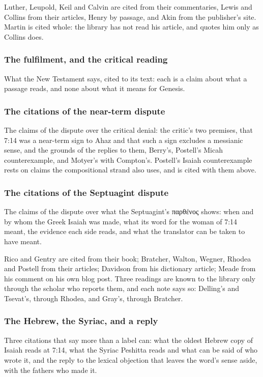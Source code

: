 \documentclass[11pt]{article}
\begin{document}
Luther, Leupold, Keil and Calvin are cited from their commentaries, Lewis and Collins from their articles, Henry by passage, and Akin from the publisher’s site. Martin is cited whole: the library has not read his article, and quotes him only as Collins does.

\subsubsection*{The fulfilment, and the critical reading}
What the New Testament says, cited to its text: each is a claim about what a passage reads, and none about what it means for Genesis.

\subsubsection*{The citations of the near-term dispute}
The claims of the dispute over the critical denial: the critic’s two premises, that 7:14 was a near-term sign to Ahaz and that such a sign excludes a messianic sense, and the grounds of the replies to them, Berry’s, Postell’s Micah counterexample, and Motyer’s with Compton’s. Postell’s Isaiah counterexample rests on claims the compositional strand also uses, and is cited with them above.

\subsubsection*{The citations of the Septuagint dispute}
The claims of the dispute over what the Septuagint’s παρθένος shows: when and by whom the Greek Isaiah was made, what its word for the woman of 7:14 meant, the evidence each side reads, and what the translator can be taken to have meant.

Rico and Gentry are cited from their book; Bratcher, Walton, Wegner, Rhodea and Postell from their articles; Davidson from his dictionary article; Meade from his comment on his own blog post. Three readings are known to the library only through the scholar who reports them, and each note says so: Delling’s and Tsevat’s, through Rhodea, and Gray’s, through Bratcher.

\subsubsection*{The Hebrew, the Syriac, and a reply}
Three citations that say more than a label can: what the oldest Hebrew copy of Isaiah reads at 7:14, what the Syriac Peshitta reads and what can be said of who wrote it, and the reply to the lexical objection that leaves the word’s sense aside, with the fathers who made it.
\end{document}
